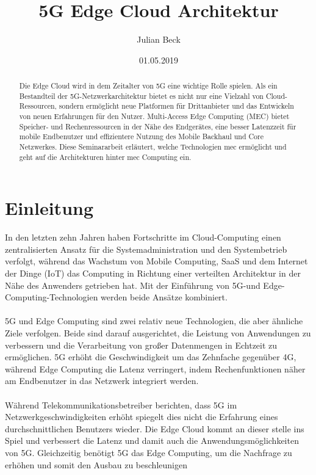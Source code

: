 \documentclass[runningheads]{llncs}
\title{5G Edge Cloud Architektur}
\author{Julian Beck}
\institute{Betreuer: Prof. Dr. rer. nat. Oliver Waldhorst}
\date{01.05.2019}
\numberwithin{figure}{section}
\begin{document}
\let\oldaddcontentsline\addcontentsline
\def\addcontentsline#1#2#3{}
\maketitle
\def\addcontentsline#1#2#3{\oldaddcontentsline{#1}{#2}{#3}}



\begin{abstract}
  Die Edge Cloud wird in dem Zeitalter von 5G eine wichtige Rolle spielen. 
  Als ein Bestandteil der 5G-Netzwerkarchitektur bietet es nicht nur eine Vielzahl von Cloud-Ressourcen, sondern
  ermöglicht neue Platformen für Drittanbieter und das Entwickeln von neuen Erfahrungen für den Nutzer.
  Multi-Access Edge Computing (MEC) bietet Speicher- und Rechenressourcen in der Nähe des Endgerätes, 
  eine besser Latenzzeit für mobile Endbenutzer und effizientere Nutzung des Mobile Backhaul
  und Core Netzwerkes. Diese Seminararbeit erläutert, welche Technologien \acrfull{mec} ermöglicht und geht auf die Architekturen 
  hinter \Acrshort{mec} Computing ein.
\end{abstract}

\tableofcontents 
\newpage
\printglossary[type=\acronymtype]
\newpage

\section{Einleitung}
\label{sec:Einleitung}
In den letzten zehn Jahren haben Fortschritte im Cloud-Computing einen zentralisierten Ansatz für die Systemadministration und den 
Systembetrieb verfolgt, während das Wachstum von Mobile Computing, 
SaaS und dem Internet der Dinge (IoT) das Computing in Richtung einer verteilten Architektur in der Nähe des Anwenders getrieben hat. 
Mit der Einführung von 5G-und Edge-Computing-Technologien werden beide Ansätze kombiniert.
\\
\\
5G und Edge Computing sind zwei relativ neue Technologien, die aber ähnliche Ziele verfolgen. 
Beide sind darauf ausgerichtet, die Leistung von Anwendungen zu verbessern 
und die Verarbeitung von großer Datenmengen in Echtzeit zu ermöglichen. 
5G erhöht die Geschwindigkeit um das Zehnfache gegenüber 4G, 
während  Edge Computing die Latenz verringert, indem Rechenfunktionen näher am Endbenutzer in das Netzwerk integriert werden.
\\
\\
Während Telekommunikationsbetreiber berichten, 
dass 5G im Netzwerkgeschwindigkeiten erhöht
spiegelt dies nicht die Erfahrung eines durchschnittlichen Benutzers wieder. 
Die Edge Cloud kommt an dieser stelle ins Spiel und verbessert die Latenz und 
damit auch die Anwendungsmöglichkeiten von 5G.
Gleichzeitig benötigt 5G das Edge Computing, um die Nachfrage zu erhöhen und somit den Ausbau zu beschleunigen
\end{document}
